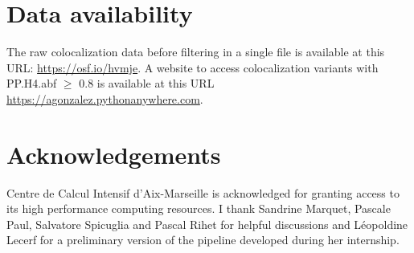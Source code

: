 \section*{Data availability}

The raw colocalization data before filtering in a single file is available at this URL: \url{https://osf.io/hvmje}.
%
A website to access colocalization variants with PP.H4.abf $\geq$ 0.8 is available at this URL \url{https://agonzalez.pythonanywhere.com}.

\section*{Acknowledgements}

Centre de Calcul Intensif d'Aix-Marseille is acknowledged for granting access to its high performance computing resources.
%
I thank Sandrine Marquet, Pascale Paul, Salvatore Spicuglia and Pascal Rihet for helpful discussions and L\'eopoldine Lecerf for a preliminary version of the pipeline developed during her internship.


